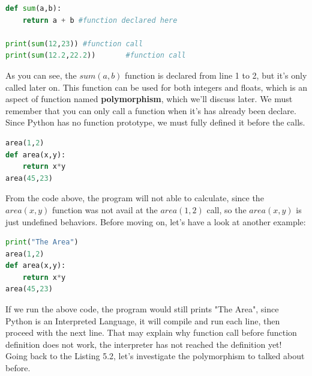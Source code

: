\documentclass[twoside,final]{hcmut-report}
\begin{document}
\begin{lstlisting}[language=Python, caption=Simple Summation Function]
def sum(a,b):
    return a + b #function declared here

print(sum(12,23)) #function call
print(sum(12.2,22.2))		#function call

\end{lstlisting}

\hspace*{6.5mm} As you can see, the $sum(a,b)$ function is declared from line 1 to 2, but it's only called later on. This function can be used for both integers and floats, which is an aspect of function named \textbf{polymorphism}, which we'll discuss later. We must remember that you can only call a function when it's has already been declare. Since Python has no function prototype, we must fully defined it before the calls.
\begin{lstlisting}[language=Python, caption=Function call before definition]
area(1,2)
def area(x,y):
    return x*y
area(45,23)
\end{lstlisting}
\hspace*{6.5mm} From the code above, the program will not able to calculate, since the $area(x,y)$ function was not avail at the $area(1,2)$ call, so the $area(x,y)$ is just undefined behaviors. Before moving on, let's have a look at another example:
\begin{lstlisting}[language=Python, caption=Execute until error]
print("The Area")
area(1,2)
def area(x,y):
    return x*y
area(45,23)
\end{lstlisting}
\hspace*{6.5mm} If we run the above code, the program would still prints "The Area", since Python is an Interpreted Language, it will compile and run each line, then proceed with the next line. That may explain why function call before function definition does not work, the interpreter has not reached the definition yet!\\
\hspace*{6.5mm} Going back to the Listing 5.2, let's investigate the polymorphism to talked about before. 
\end{document}
